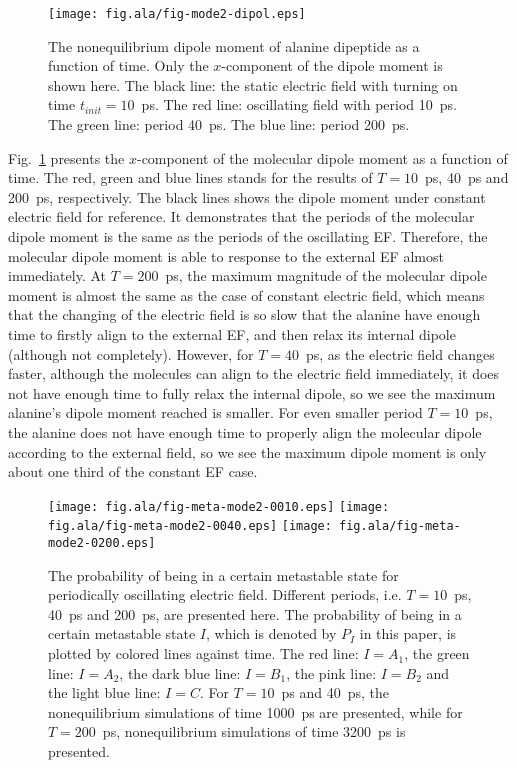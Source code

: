\documentclass[a4paper,preprint,unsortedaddress,onecolumn]{revtex4-1}
\begin{document}
\begin{figure}
  \centering
  \texttt{[image: fig.ala/fig-mode2-dipol.eps]}
  \caption{The nonequilibrium dipole moment of alanine dipeptide as a
    function of time. Only the $x$-component of the dipole moment is
    shown here. The black line: the static electric field with turning on
    time $t_{init} = 10$~ps. The red line: oscillating field with period
    10~ps. The green line: period 40~ps. The blue line: period 200~ps.}
  \label{fig:tmp8}
\end{figure}


Fig.~\ref{fig:tmp8} presents the $x$-component of the molecular dipole moment as
a function of time. The red, green and blue lines stands for the
results of $T=10$~ps, 40~ps and 200~ps, respectively. The black lines
shows the dipole moment under constant electric field
for reference.
It demonstrates that the periods of the molecular dipole moment
is the same as the periods of the oscillating EF. Therefore,
the molecular dipole moment
is able to response to the external EF almost immediately.
At $T=200$~ps, the maximum magnitude of the molecular
dipole moment is almost the same as the case of constant electric field, which
means that the changing of the electric field is so slow that the
alanine have enough time to firstly align to the external EF, and then
relax its internal dipole (although not completely). However,
for $T=40$~ps, as the electric field changes faster,
although the molecules can align to the electric field immediately,
it does not have enough time to fully relax the internal dipole, so we
see the maximum alanine's dipole moment reached is smaller.
For even smaller period $T=10$~ps, the alanine does not have enough
time  to properly align the molecular dipole according to the external
field, so we see the maximum dipole moment is only about one third of the
constant EF case.

\begin{figure}
  \centering
  \texttt{[image: fig.ala/fig-meta-mode2-0010.eps]}
  \texttt{[image: fig.ala/fig-meta-mode2-0040.eps]}
  \texttt{[image: fig.ala/fig-meta-mode2-0200.eps]}
  \caption{ The probability of being in a certain metastable state for
    periodically oscillating electric field. Different periods,
    i.e. $T=10$~ps, 40~ps and 200~ps, are presented here.  The
    probability of being in a certain metastable state $I$, which is
    denoted by $P_I$ in this paper, is plotted by colored lines against
    time. The red line: $I = A_1$, the green line: $I = A_2$, the dark
    blue line: $I = B_1$, the pink line: $I = B_2$ and the light blue
    line: $I = C$. For $T=10$~ps and 40~ps, the nonequilibrium
    simulations of time 1000~ps are presented, while for $T=200$~ps,
    nonequilibrium simulations of time 3200~ps is presented.  }
  \label{fig:tmp9}
\end{figure}
\end{document}
